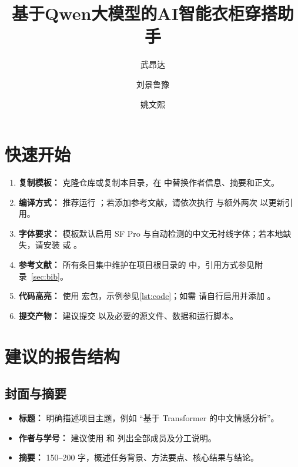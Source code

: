 \documentclass{applemlr}
\title{基于Qwen大模型的AI智能衣柜穿搭助手}
\author{武昂达}
\author{刘景鲁豫}
\author{姚文熙}
\affiliation{上海交通大学自动化与感知学院}
\begin{document}
\maketitle

\tableofcontents
\newpage

\section{快速开始}
\label{sec:quickstart}

\begin{enumerate}
  \item \textbf{复制模板：} 克隆仓库或复制本目录，在  中替换作者信息、摘要和正文。
  \item \textbf{编译方式：} 推荐运行 ；若添加参考文献，请依次执行  与额外两次  以更新引用。
  \item \textbf{字体要求：} 模板默认启用 SF Pro 与自动检测的中文无衬线字体；若本地缺失，请安装  或 。
  \item \textbf{参考文献：} 所有条目集中维护在项目根目录的  中，引用方式参见附录~\ref{sec:bib}。
  \item \textbf{代码高亮：} 使用  宏包，示例参见\autoref{lst:code}；如需  请自行启用并添加 。
  \item \textbf{提交产物：} 建议提交  以及必要的源文件、数据和运行脚本。
\end{enumerate}

\section{建议的报告结构}
\label{sec:structure}

\subsection{封面与摘要}
\begin{itemize}
  \item \textbf{标题：} 明确描述项目主题，例如 ``基于 Transformer 的中文情感分析''。
  \item \textbf{作者与学号：} 建议使用 \code{\string\author} 和 \code{\string\affiliation} 列出全部成员及分工说明。
  \item \textbf{摘要：} 150--200 字，概述任务背景、方法要点、核心结果与结论。
\end{itemize}
\end{document}
